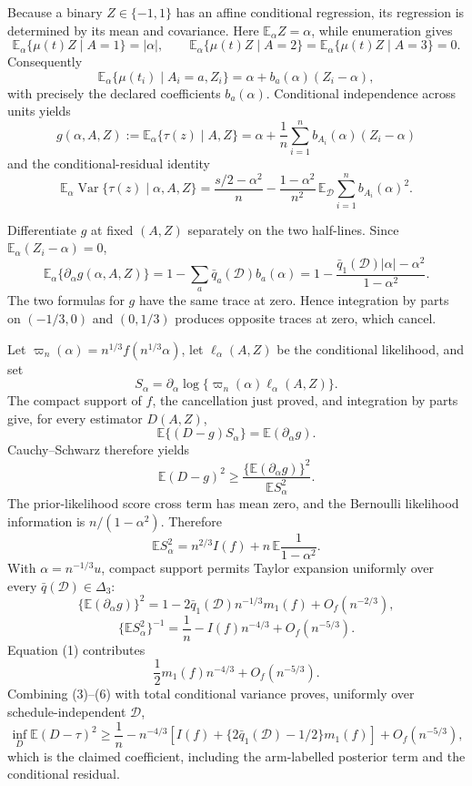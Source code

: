 Because a binary \(Z\in\{-1,1\}\) has an affine conditional regression, its regression is determined by its mean and covariance.  Here \(\mathbb E_\alpha Z=\alpha\), while enumeration gives
\[
\mathbb E_\alpha\{\mu(t)Z\mid A=1\}=|\alpha|,
\qquad
\mathbb E_\alpha\{\mu(t)Z\mid A=2\}
=\mathbb E_\alpha\{\mu(t)Z\mid A=3\}=0.
\]
Consequently
\[
\mathbb E_\alpha\{\mu(t_i)\mid A_i=a,Z_i\}
=\alpha+b_a(\alpha)(Z_i-\alpha),
\]
with precisely the declared coefficients \(b_a(\alpha)\).  Conditional independence across units yields
\[
g(\alpha,A,Z):=\mathbb E_\alpha\{\tau(z)\mid A,Z\}
=\alpha+\frac1n\sum_{i=1}^n b_{A_i}(\alpha)(Z_i-\alpha)
\]
and the conditional-residual identity
\[
\mathbb E_\alpha\operatorname{Var}\{\tau(z)\mid\alpha,A,Z\}
=\frac{s/2-\alpha^2}{n}
-\frac{1-\alpha^2}{n^2}\,
\mathbb E_{\mathcal D}\sum_{i=1}^n b_{A_i}(\alpha)^2.
\tag{1}
\]

Differentiate \(g\) at fixed \((A,Z)\) separately on the two half-lines.  Since \(\mathbb E_\alpha(Z_i-\alpha)=0\),
\[
\mathbb E_\alpha\{\partial_\alpha g(\alpha,A,Z)\}
=1-\sum_a\bar q_a(\mathcal D)b_a(\alpha)
=1-\frac{\bar q_1(\mathcal D)|\alpha|-\alpha^2}{1-\alpha^2}.
\tag{2}
\]
The two formulas for \(g\) have the same trace at zero.  Hence integration by parts on \((-1/3,0)\) and \((0,1/3)\) produces opposite traces at zero, which cancel.

Let \(\varpi_n(\alpha)=n^{1/3}f(n^{1/3}\alpha)\), let \(\ell_\alpha(A,Z)\) be the conditional likelihood, and set
\[
S_\alpha=\partial_\alpha\log\{\varpi_n(\alpha)\ell_\alpha(A,Z)\}.
\]
The compact support of \(f\), the cancellation just proved, and integration by parts give, for every estimator \(D(A,Z)\),
\[
\mathbb E\{(D-g)S_\alpha\}=\mathbb E(\partial_\alpha g).
\]
Cauchy--Schwarz therefore yields
\[
\mathbb E(D-g)^2\geq
\frac{\{\mathbb E(\partial_\alpha g)\}^2}{\mathbb E S_\alpha^2}.
\tag{3}
\]
The prior-likelihood score cross term has mean zero, and the Bernoulli likelihood information is \(n/(1-\alpha^2)\).  Therefore
\[
\mathbb E S_\alpha^2
=n^{2/3}I(f)+n\,\mathbb E\frac1{1-\alpha^2}.
\tag{4}
\]
With \(\alpha=n^{-1/3}u\), compact support permits Taylor expansion uniformly over every \(\bar q(\mathcal D)\in\Delta_3\):
\[
\{\mathbb E(\partial_\alpha g)\}^2
=1-2\bar q_1(\mathcal D)n^{-1/3}m_1(f)+O_f(n^{-2/3}),
\]
\[
\{\mathbb E S_\alpha^2\}^{-1}
=\frac1n-I(f)n^{-4/3}+O_f(n^{-5/3}).
\tag{5}
\]
Equation (1) contributes
\[
\frac12m_1(f)n^{-4/3}+O_f(n^{-5/3}).
\tag{6}
\]
Combining (3)--(6) with total conditional variance proves, uniformly over schedule-independent \(\mathcal D\),
\[
\inf_D\mathbb E(D-\tau)^2
\geq \frac1n-n^{-4/3}
\left[I(f)+\{2\bar q_1(\mathcal D)-1/2\}m_1(f)\right]
+O_f(n^{-5/3}),
\]
which is the claimed coefficient, including the arm-labelled posterior term and the conditional residual.

